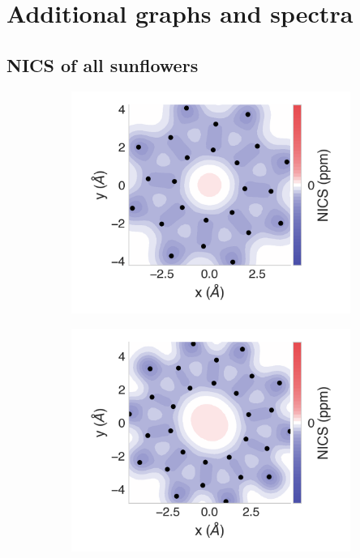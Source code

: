 \documentclass[
	fontsize=10pt, %
	twoside=true, %
	numbers=noenddot, %
]{kaobook}
\begin{document}

\chapter{Additional graphs and spectra}

\newpage
\section{NICS of all sunflowers}

\begin{figure}[h]
\centering
\begin{subfigure}{5.5cm}\centering\includegraphics{s08-2d}\end{subfigure}%
\begin{subfigure}{5.5cm}\centering\includegraphics{s10-2d}\end{subfigure}%

\end{figure}
\end{document}
